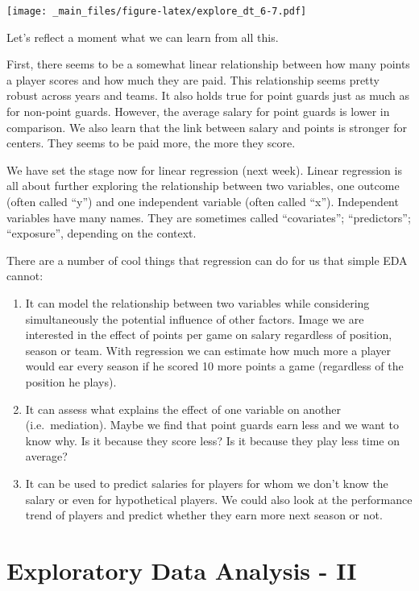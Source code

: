 \documentclass[
]{book}
\begin{document}
\texttt{[image: \_main\_files/figure-latex/explore\_dt\_6-7.pdf]}

Let's reflect a moment what we can learn from all this.

First, there seems to be a somewhat linear relationship between how many points
a player scores and how much they are paid. This relationship seems pretty robust across years and teams. It also holds true for point guards just as much as for non-point guards. However, the average salary for point guards is lower in comparison. We also learn that the link between salary and points is stronger for centers. They seems to be paid more, the more they score.

We have set the stage now for linear regression (next week). Linear regression
is all about further exploring the relationship between two variables, one outcome (often called ``y'') and one independent variable (often called ``x''). Independent variables have many names. They are sometimes called ``covariates''; ``predictors''; ``exposure'', depending on the context.

There are a number of cool things that regression can do for us that simple EDA cannot:

\begin{enumerate}
\def\labelenumi{\arabic{enumi})}
\item
  It can model the relationship between two variables while considering simultaneously the potential influence of other factors. Image we are interested
  in the effect of points per game on salary regardless of position, season or team.
  With regression we can estimate how much more a player would ear every season
  if he scored 10 more points a game (regardless of the position he plays).
\item
  It can assess what explains the effect of one variable on another (i.e.~mediation). Maybe we find that point guards earn less and we want to know why. Is it because they score less? Is it because they play less time on average?
\item
  It can be used to predict salaries for players for whom we don't know the salary or even for hypothetical players. We could also look at the performance trend of players and predict whether they earn more next season or not.
\end{enumerate}

\hypertarget{eda-2}{%
\chapter{Exploratory Data Analysis - II}\label{eda-2}}
\end{document}
